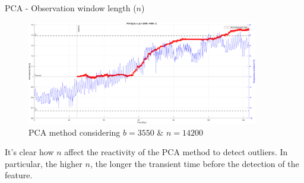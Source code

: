 \begin{frame}{PCA - Observation window length ($n$)}
\begin{figure}[H]
{            \includegraphics[width=0.9\textwidth]{img/Window/PCA_Window_14200.png}
            \caption{PCA method considering $b = 3550$ \& $n = 14200$}
        }
    \end{figure}

    \vspace{-9pt}

    It's clear how $n$ affect the reactivity of the PCA method to detect outliers.
    In particular, the higher $n$, the longer the transient time before the detection of the feature.

\end{frame}